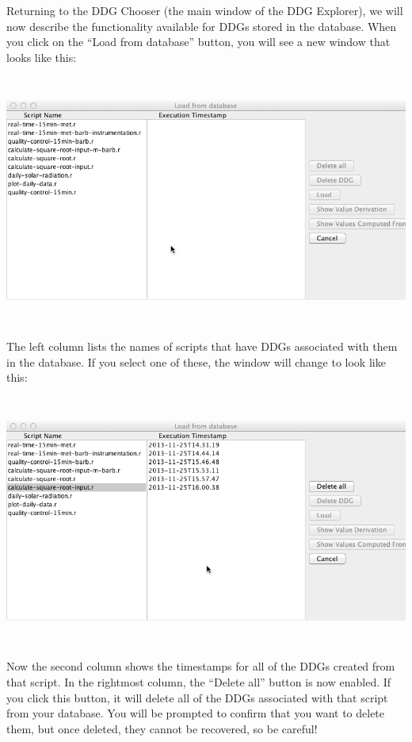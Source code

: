 \documentclass[12pt]{article}
\begin{document}
{{\mdseries\upshape\color{black}
Returning to the DDG Chooser (the main window of the DDG Explorer), we will now describe the functionality available for DDGs stored in the database. When you click on the “Load from database” button, you will see a new window that looks like this:}

 \includegraphics[width=6.5in,height=3.25in]{UsingDDGExplorer-img/UsingDDGExplorer-img005.png} 


\bigskip

{\mdseries\upshape\color{black}
The left column lists the names of scripts that have DDGs associated with them in the database. If you select one of these, the window will change to look like this:}

 \includegraphics[width=6.5in,height=3.25in]{UsingDDGExplorer-img/UsingDDGExplorer-img006.png} 

{\mdseries\upshape\color{black}
Now the second column shows the timestamps for all of the DDGs created from that script. In the rightmost column, the “Delete all” button is now enabled. If you click this button, it will delete all of the DDGs associated with that script from your database. You will be prompted to confirm that you want to delete them, but once deleted, they cannot be recovered, so be careful!}

}
\end{document}
